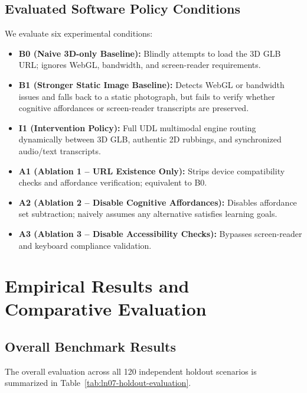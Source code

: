 \documentclass[11pt,a4paper]{article}
\begin{document}
\subsection{Evaluated Software Policy Conditions}
We evaluate six experimental conditions:
\begin{itemize}
    \item \textbf{B0 (Naive 3D-only Baseline):} Blindly attempts to load the 3D GLB URL; ignores WebGL, bandwidth, and screen-reader requirements.
    \item \textbf{B1 (Stronger Static Image Baseline):} Detects WebGL or bandwidth issues and falls back to a static photograph, but fails to verify whether cognitive affordances or screen-reader transcripts are preserved.
    \item \textbf{I1 (Intervention Policy):} Full UDL multimodal engine routing dynamically between 3D GLB, authentic 2D rubbings, and synchronized audio/text transcripts.
    \item \textbf{A1 (Ablation 1 -- URL Existence Only):} Strips device compatibility checks and affordance verification; equivalent to B0.
    \item \textbf{A2 (Ablation 2 -- Disable Cognitive Affordances):} Disables affordance set subtraction; naively assumes any alternative satisfies learning goals.
    \item \textbf{A3 (Ablation 3 -- Disable Accessibility Checks):} Bypasses screen-reader and keyboard compliance validation.
\end{itemize}

\section{Empirical Results and Comparative Evaluation}

\subsection{Overall Benchmark Results}
The overall evaluation across all 120 independent holdout scenarios is summarized in Table~\ref{tab:ln07-holdout-evaluation}.


\end{document}

